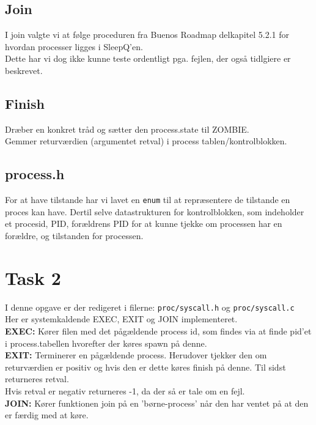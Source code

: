 \documentclass[a4paper,12pt]{article}
\begin{document}
\subsection*{Join}
I join valgte vi at følge proceduren fra Buenos Roadmap delkapitel 5.2.1 for hvordan processer ligges i SleepQ'en. \\
Dette har vi dog ikke kunne teste ordentligt pga. fejlen, der også tidlgiere er beskrevet.


\subsection*{Finish}
Dræber en konkret tråd og sætter den process.state til ZOMBIE. 
\\
Gemmer returværdien (argumentet retval) i process tablen/kontrolblokken. 

\subsection*{process.h}
For at have tilstande har vi lavet en \texttt{enum} til at repræsentere de tilstande en proces kan have. Dertil selve datastrukturen for kontrolblokken, som indeholder et procesid, PID, forældrens PID for at kunne tjekke om processen har en forældre, og tilstanden for processen.


\section*{Task 2}
I denne opgave er der redigeret i filerne: \texttt{proc/syscall.h} og \texttt{proc/syscall.c}
\\[5px]
Her er systemkaldende EXEC, EXIT og JOIN implementeret. 
\\[5px]
\textbf{EXEC:} Kører filen med det pågældende process id, som findes via at finde pid'et i process.tabellen hvorefter der køres spawn på denne. 
\\
\textbf{EXIT:} Terminerer en pågældende process. Herudover tjekker den om returværdien er positiv og hvis den er dette køres finish på denne. Til sidst returneres retval.
\\
Hvis retval er negativ returneres -1, da der så er tale om en fejl.
\\
\textbf{JOIN:}
Kører funktionen join på en 'børne-process' når den har ventet på at den er færdig med at køre.
\end{document}
